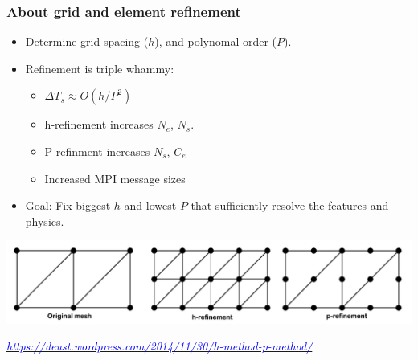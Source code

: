 \begin{frame}\frametitle{About grid and element refinement}
\begin{multicols}{2}
\begin{itemize}
\item Determine grid spacing ($h$), and polynomal order ($P$).
\item Refinement is triple whammy:
\begin{itemize}
\item $\Delta{T_s} \approx O(h / P^2)$
\item h-refinement increases $N_e$, $N_s$.
\item P-refinment increases $N_s$, $C_e$
\item Increased MPI message sizes
\end{itemize}
\item Goal: Fix biggest $h$ and lowest $P$ that sufficiently resolve the features and physics.
\end{itemize}
\vspace{15pt}
\end{multicols}
\includegraphics[width=\textwidth]{figures/hpcartoon.png}\\
\begin{center}
\href{https://deust.wordpress.com/2014/11/30/h-method-p-method/}{\textcolor{blue}{\textit{https://deust.wordpress.com/2014/11/30/h-method-p-method/}}}
\end{center}
\end{frame}

